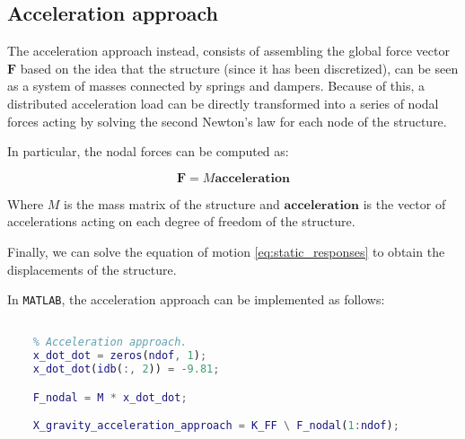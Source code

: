 \subsection{Acceleration approach}
\label{subsec:acceleration_approach}

The acceleration approach instead, consists of assembling the global force vector $\mathbf{F}$ based on the idea that the structure (since it has been discretized), can be seen as a system of masses connected by springs and dampers.
Because of this, a distributed acceleration load can be directly transformed into a series of nodal forces acting by solving the second Newton's law for each node of the structure.

In particular, the nodal forces can be computed as:

\begin{equation}
    \mathbf{F} = M \mathbf{acceleration}
\end{equation}

Where $M$ is the mass matrix of the structure and $\mathbf{acceleration}$ is the vector of accelerations acting on each degree of freedom of the structure.

Finally, we can solve the equation of motion \ref{eq:static_responses} to obtain the displacements of the structure.

In \texttt{MATLAB}, the acceleration approach can be implemented as follows:

\begin{lstlisting}[language=Matlab]

    % Acceleration approach.
    x_dot_dot = zeros(ndof, 1);
    x_dot_dot(idb(:, 2)) = -9.81;

    F_nodal = M * x_dot_dot;

    X_gravity_acceleration_approach = K_FF \ F_nodal(1:ndof);

\end{lstlisting}
